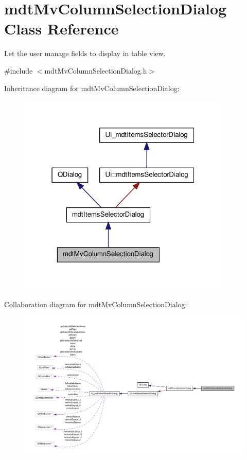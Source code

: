 \hypertarget{classmdt_mv_column_selection_dialog}{\section{mdt\-Mv\-Column\-Selection\-Dialog Class Reference}
\label{classmdt_mv_column_selection_dialog}
}


Let the user manage fields to display in table view.  




{\ttfamily \#include $<$mdt\-Mv\-Column\-Selection\-Dialog.\-h$>$}



Inheritance diagram for mdt\-Mv\-Column\-Selection\-Dialog\-:
\nopagebreak
\begin{figure}[H]
\begin{center}
\leavevmode
\includegraphics[width=286pt]{classmdt_mv_column_selection_dialog__inherit__graph}
\end{center}
\end{figure}


Collaboration diagram for mdt\-Mv\-Column\-Selection\-Dialog\-:
\nopagebreak
\begin{figure}[H]
\begin{center}
\leavevmode
\includegraphics[width=350pt]{classmdt_mv_column_selection_dialog__coll__graph}
\end{center}
\end{figure}
